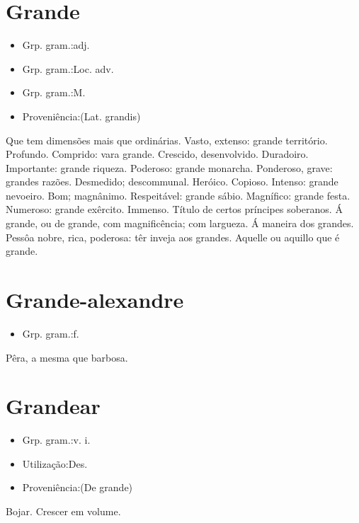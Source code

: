 \section{Grande}
\begin{itemize}
\item {Grp. gram.:adj.}
\end{itemize}
\begin{itemize}
\item {Grp. gram.:Loc. adv.}
\end{itemize}
\begin{itemize}
\item {Grp. gram.:M.}
\end{itemize}
\begin{itemize}
\item {Proveniência:(Lat. \textunderscore grandis\textunderscore )}
\end{itemize}
Que tem dimensões mais que ordinárias.
Vasto, extenso: \textunderscore grande território\textunderscore .
Profundo.
Comprido: \textunderscore vara grande\textunderscore .
Crescido, desenvolvido.
Duradoiro.
Importante: \textunderscore grande riqueza\textunderscore .
Poderoso: \textunderscore grande monarcha\textunderscore .
Ponderoso, grave: \textunderscore grandes razões\textunderscore .
Desmedido; descommunal.
Heróico.
Copioso.
Intenso: \textunderscore grande nevoeiro\textunderscore .
Bom; magnânimo.
Respeitável: \textunderscore grande sábio\textunderscore .
Magnífico: \textunderscore grande festa\textunderscore .
Numeroso: \textunderscore grande exêrcito\textunderscore .
Immenso.
Título de certos príncipes soberanos.
\textunderscore Á grande\textunderscore , ou \textunderscore de grande\textunderscore , com magnificência; com largueza.
Á maneira dos grandes.
Pessôa nobre, rica, poderosa: \textunderscore têr inveja aos grandes\textunderscore .
Aquelle ou aquillo que é grande.
\section{Grande-alexandre}
\begin{itemize}
\item {Grp. gram.:f.}
\end{itemize}
Pêra, a mesma que \textunderscore barbosa\textunderscore .
\section{Grandear}
\begin{itemize}
\item {Grp. gram.:v. i.}
\end{itemize}
\begin{itemize}
\item {Utilização:Des.}
\end{itemize}
\begin{itemize}
\item {Proveniência:(De \textunderscore grande\textunderscore )}
\end{itemize}
Bojar.
Crescer em volume.
